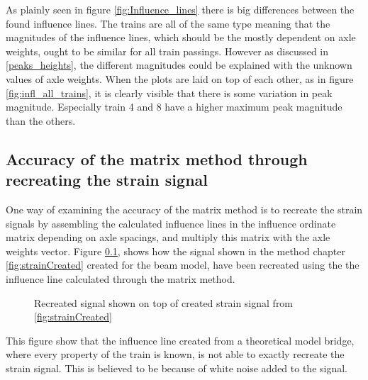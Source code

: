 As plainly seen in figure \ref{fig:Influence_lines} there is big differences between the found influence lines. The trains are all of the same type meaning that the magnitudes of the influence lines, which should be the mostly dependent on axle weights, ought to be similar for all train passings. However as discussed in \ref{peaks_heights}, the different magnitudes could be explained with the unknown values of axle weights. When the plots are laid on top of each other, as in figure \ref{fig:infl_all_trains}, it is clearly visible that there is some variation in peak magnitude. Especially train 4 and 8 have a higher maximum peak magnitude than the others.

\subsection{Accuracy of the matrix method through recreating the strain signal}
One way of examining the accuracy of the matrix method is to recreate the strain signals by assembling the calculated influence lines in the influence ordinate matrix depending on axle spacings, and multiply this matrix with the axle weights vector. Figure \ref{}, shows how the signal shown in the method chapter \ref{fig:strainCreated} created for the beam model, have been recreated using the the influence line calculated through the matrix method.
\begin{figure}[H]
	\begin{adjustbox}{center}
		
	\end{adjustbox}
	\caption{Recreated signal shown on top of created strain signal from \ref{fig:strainCreated}}
\end{figure}
This figure show that the influence line created from a theoretical model bridge, where every property of the train is known, is not able to exactly recreate the strain signal. This is believed to be because of white noise added to the signal.


